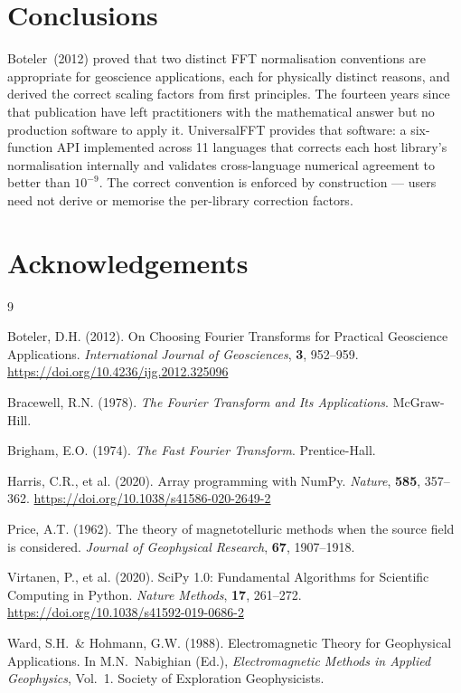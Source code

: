 \documentclass[12pt,a4paper]{article}
\begin{document}
\section{Conclusions}

Boteler~(2012) proved that two distinct FFT normalisation conventions are
appropriate for geoscience applications, each for physically distinct reasons, and
derived the correct scaling factors from first principles. The fourteen years since
that publication have left practitioners with the mathematical answer but no
production software to apply it. UniversalFFT provides that software: a
six-function API implemented across 11 languages that corrects each host
library's normalisation internally and validates cross-language numerical agreement
to better than $10^{-9}$. The correct convention is enforced by construction ---
users need not derive or memorise the per-library correction factors.

\section*{Acknowledgements}


\begin{thebibliography}{9}

Boteler, D.H. (2012).
On Choosing Fourier Transforms for Practical Geoscience Applications.
\textit{International Journal of Geosciences}, \textbf{3}, 952--959.
\url{https://doi.org/10.4236/ijg.2012.325096}

Bracewell, R.N. (1978).
\textit{The Fourier Transform and Its Applications}.
McGraw-Hill.

Brigham, E.O. (1974).
\textit{The Fast Fourier Transform}.
Prentice-Hall.

Harris, C.R., et al. (2020).
Array programming with NumPy.
\textit{Nature}, \textbf{585}, 357--362.
\url{https://doi.org/10.1038/s41586-020-2649-2}

Price, A.T. (1962).
The theory of magnetotelluric methods when the source field is considered.
\textit{Journal of Geophysical Research}, \textbf{67}, 1907--1918.

Virtanen, P., et al. (2020).
SciPy 1.0: Fundamental Algorithms for Scientific Computing in Python.
\textit{Nature Methods}, \textbf{17}, 261--272.
\url{https://doi.org/10.1038/s41592-019-0686-2}

Ward, S.H.\ \& Hohmann, G.W. (1988).
Electromagnetic Theory for Geophysical Applications.
In M.N.\ Nabighian (Ed.), \textit{Electromagnetic Methods in Applied Geophysics},
Vol.\ 1. Society of Exploration Geophysicists.

\end{thebibliography}
\end{document}
